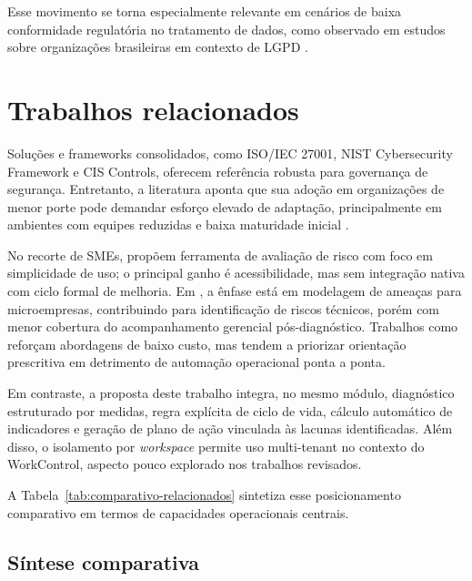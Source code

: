 \documentclass[12pt]{article}
\begin{document}
Esse movimento se torna especialmente relevante em cenários de baixa conformidade regulatória no tratamento de dados, como observado em estudos sobre organizações brasileiras em contexto de LGPD \cite{mdpi_lgpd2022}.

\section{Trabalhos relacionados}

Soluções e frameworks consolidados, como ISO/IEC 27001, NIST Cybersecurity Framework e CIS Controls, oferecem referência robusta para governança de segurança. Entretanto, a literatura aponta que sua adoção em organizações de menor porte pode demandar esforço elevado de adaptação, principalmente em ambientes com equipes reduzidas e baixa maturidade inicial \cite{rombaldo2023,electronics2022,cheenepalli2025}.

No recorte de SMEs, \cite{curtin2024} propõem ferramenta de avaliação de risco com foco em simplicidade de uso; o principal ganho é acessibilidade, mas sem integração nativa com ciclo formal de melhoria. Em \cite{getir2024}, a ênfase está em modelagem de ameaças para microempresas, contribuindo para identificação de riscos técnicos, porém com menor cobertura do acompanhamento gerencial pós-diagnóstico. Trabalhos como \cite{researchgate2024,scirp2024,papathanasiou2025} reforçam abordagens de baixo custo, mas tendem a priorizar orientação prescritiva em detrimento de automação operacional ponta a ponta.

Em contraste, a proposta deste trabalho integra, no mesmo módulo, diagnóstico estruturado por medidas, regra explícita de ciclo de vida, cálculo automático de indicadores e geração de plano de ação vinculada às lacunas identificadas. Além disso, o isolamento por \textit{workspace} permite uso multi-tenant no contexto do WorkControl, aspecto pouco explorado nos trabalhos revisados.

A Tabela~\ref{tab:comparativo-relacionados} sintetiza esse posicionamento comparativo em termos de capacidades operacionais centrais.

\subsection{Síntese comparativa}
\end{document}
